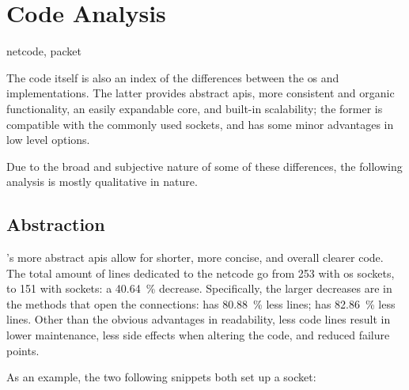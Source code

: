\chapter{Code Analysis}\label{ch:code}

\begin{keywords}
	netcode, packet
\end{keywords}

The code itself is also an index of the differences between the \gls{os} and  implementations. The latter provides abstract \glspl{api}, more consistent and organic functionality, an easily expandable core, and built-in scalability; the former is compatible with the commonly used  sockets, and has some minor advantages in low level options.

Due to the broad and subjective nature of some of these differences, the following analysis is mostly qualitative in nature.

\section{Abstraction}\label{sc:code:abstraction}

's more abstract \glspl{api} allow for shorter, more concise, and overall clearer code. The total amount of lines dedicated to the \gls{netcode} go from \num{253} with \gls{os} sockets, to \num{151} with  sockets: a \SI{40,64}{\percent} decrease. Specifically, the larger decreases are in the methods that open the connections:  has \SI{80,88}{\percent} less lines;  has \SI{82,86}{\percent} less lines. Other than the obvious advantages in readability, less code lines result in lower maintenance, less side effects when altering the code, and reduced failure points.



As an example, the two following snippets both set up a socket:

